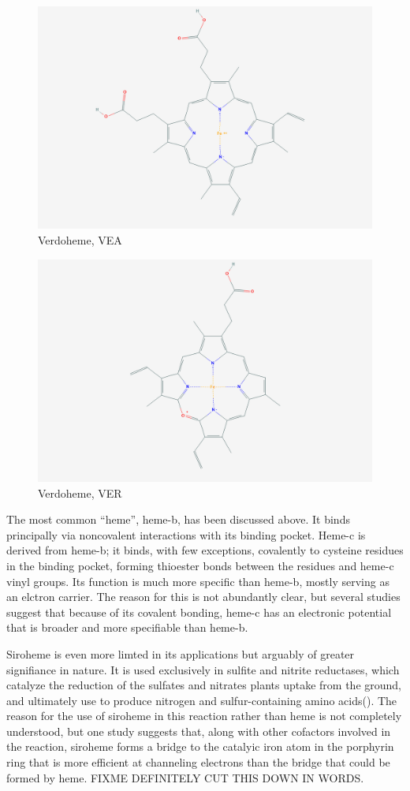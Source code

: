 \documentclass[a4paper, nobind]{templates/ociamthesis}
\begin{document}
\begin{figure}

{\centering \includegraphics[width=0.5\linewidth]{figures/VEApubchem} 

}

\caption{Verdoheme, VEA}\label{fig:structVEA}
\end{figure}
\begin{figure}

{\centering \includegraphics[width=0.5\linewidth]{figures/VERpubchem} 

}

\caption{Verdoheme, VER}\label{fig:structVER}
\end{figure}

The most common ``heme'', heme-b, has been discussed above. It binds principally via noncovalent interactions with its binding pocket. Heme-c is derived from heme-b; it binds, with few exceptions, covalently to cysteine residues in the binding pocket, forming thioester bonds between the residues and heme-c vinyl groups. Its function is much more specific than heme-b, mostly serving as an elctron carrier. The reason for this is not abundantly clear, but several studies suggest that because of its covalent bonding, heme-c has an electronic potential that is broader and more specifiable than heme-b. \autocite{Bowman2008,Kleingardner2015}

Siroheme is even more limted in its applications but arguably of greater signifiance in nature. It is used exclusively in sulfite and nitrite reductases, which catalyze the reduction of the sulfates and nitrates plants uptake from the ground, and ultimately use to produce nitrogen and sulfur-containing amino acids(\textcite{Tripathy2010}). The reason for the use of siroheme in this reaction rather than heme is not completely understood, but one study suggests that, along with other cofactors involved in the reaction, siroheme forms a bridge to the catalyic iron atom in the porphyrin ring that is more efficient at channeling electrons than the bridge that could be formed by heme.\autocite{Branzanic2019} FIXME DEFINITELY CUT THIS DOWN IN WORDS.
\end{document}
